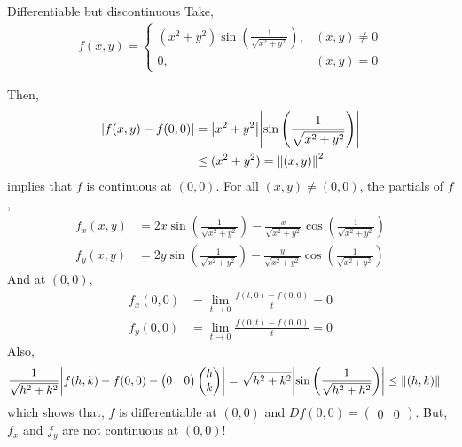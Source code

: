 \documentclass[../Analysis-3.tex]{subfiles}
\begin{document}
\begin{Eg}{Differentiable but discontinuous}{}
  Take, \begin{align*}
    f(x,y) = \begin{cases}
               \left( x^2+y^2 \right)\sin{\left( \frac{1}{\sqrt{x^2+y^2}} \right)}, & (x,y) \not= 0 \\
               0,                                                                   & (x,y) = 0
             \end{cases}
  \end{align*}

  Then, \begin{align*}
    \abs{f(x,y) - f(0,0)}
     & = \abs{x^2+y^2}\abs{\sin{\left( \frac{1}{\sqrt{x^2+y^2}} \right)}} \\
     & \leq (x^2+y^2) = \norm{(x,y)}^2
  \end{align*}
  implies that $ f $ is continuous at $ (0,0) $. For all $ (x,y) \not= (0,0) $, the partials of $ f $, \begin{align*}
    f_x(x,y) & = 2x\sin{\left( \frac{1}{\sqrt{x^2+y^2}} \right)} - \frac{x}{\sqrt{x^2+y^2}}\cos{\left( \frac{1}{\sqrt{x^2+y^2}} \right)} \\
    f_y(x,y) & = 2y\sin{\left( \frac{1}{\sqrt{x^2+y^2}} \right)} - \frac{y}{\sqrt{x^2+y^2}}\cos{\left( \frac{1}{\sqrt{x^2+y^2}} \right)}
  \end{align*}
  And at $(0,0)$, \begin{align*}
    f_x(0,0) & = \lim_{t \to 0} \frac{f(t,0) - f(0,0)}{t} = 0 \\
    f_y(0,0) & = \lim_{t \to 0} \frac{f(0,t) - f(0,0)}{t} = 0
  \end{align*}
  Also, \begin{align*}
    \frac{1}{\sqrt{h^2+k^2}}\abs{f(h,k) - f(0,0) - \begin{pmatrix} 0 & 0 \end{pmatrix}\begin{pmatrix} h \\ k \end{pmatrix}} & = \sqrt{h^2+k^2}\abs{\sin{\left( \frac{1}{\sqrt{h^2+h^2}} \right)}} \leq \norm{(h,k)}
  \end{align*}
  which shows that, $ f $ is differentiable at $ (0,0) $ and $ Df(0,0) = \begin{pmatrix} 0 & 0 \end{pmatrix} $. But, $ f_x $ and $ f_y $ are not continuous at $ (0,0) $!
\end{Eg}
\end{document}
